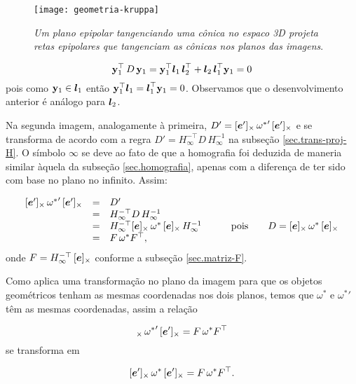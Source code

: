 \begin{figure}[!htb]
\centering
\texttt{[image: geometria-kruppa]}
\caption{\textit{Um plano epipolar tangenciando uma cônica no espaco 3D projeta retas epipolares que tangenciam as cônicas nos planos das imagens}.}
\label{geometria-kruppa}
\end{figure}

\begin{equation*}
{\bf y}_1^\top\,D\,{\bf y}_1={\bf y}_1^\top \boldsymbol{l}_1\,\boldsymbol{l}_2^\top + \boldsymbol{l}_2\,\boldsymbol{l}_1^\top{\bf y}_1=0
\end{equation*}
pois como ${\bf y}_1\in\boldsymbol{l}_1$ então ${\bf y}_1^\top \boldsymbol{l}_1=\boldsymbol{l}_1^\top{\bf y}_1=0$. Observamos que o desenvolvimento anterior é análogo para $\boldsymbol{l}_2$.

Na segunda imagem, analogamente à primeira, $D'=[\boldsymbol{e}']_\times\,{{\bf \omega}^*}'\,[\boldsymbol{e}']_\times$ e se transforma de acordo com a regra $D'=H_\infty^{-\top}D\,H_\infty^{-1}$ na subseção \ref{sec.trans-proj-H}. O símbolo $\infty$ se deve ao fato de que a homografia foi deduzida de maneria similar àquela da subseção  \ref{sec.homografia}, apenas com a diferença de ter sido com base no plano no infinito. Assim:

\begin{equation}
\begin{array}{rcll}
[\boldsymbol{e}']_\times\,{{\bf \omega}^*}'\,[\boldsymbol{e}']_\times&=&D'&\\
&=&H_\infty^{-\top}D\,H_\infty^{-1}&\\
&=&H_\infty^{-\top}[\boldsymbol{e}]_\times\,{\bf \omega}^*\,[\boldsymbol{e}]_\times\,H_\infty^{-1}&\qquad\text{pois}\qquad D=[\boldsymbol{e}]_\times\,{\bf \omega}^*\,[\boldsymbol{e}]_\times\\
&=&F\,\omega^* F^\top,&
\end{array}
\end{equation}
onde $F=H_\infty^{-\top}\,[\boldsymbol{e}]_\times$ conforme a subseção \ref{sec.matriz-F}. 


Como \cite{2503343} aplica uma transformação no plano da imagem para que os objetos geométricos tenham as mesmas coordenadas nos dois planos, temos que $\omega^*$ e ${\omega^*}'$ têm as mesmas coordenadas, assim a relação

\begin{equation*}
[\e']_\times\,{{\bf \omega}^*}'\,[\e']_\times=F\,\omega^* F^\top
\end{equation*}
se transforma em 

\begin{equation}\label{eq.kruppa}
[\boldsymbol{e}']_\times\,{\bf \omega}^*\,[\boldsymbol{e}']_\times=F\,\omega^* F^\top.
\end{equation}



